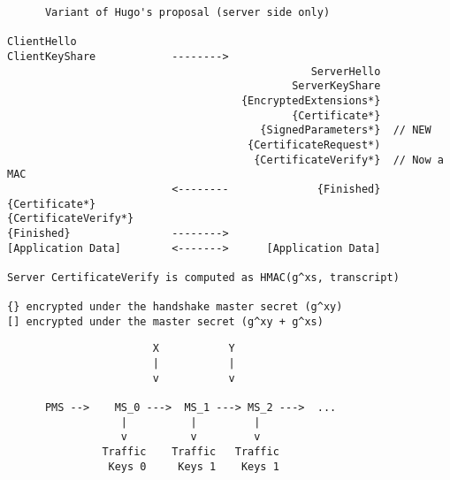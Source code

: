 \documentclass[helvetica]{seminar}
\begin{document}
\begin{slide}
\begin{footnotesize}
\begin{verbatim}
      Variant of Hugo's proposal (server side only)

ClientHello
ClientKeyShare            -------->
                                                ServerHello
                                             ServerKeyShare
                                     {EncryptedExtensions*}
                                             {Certificate*}
                                        {SignedParameters*}  // NEW
                                      {CertificateRequest*)
                                       {CertificateVerify*}  // Now a MAC                                                         
                          <--------              {Finished}
{Certificate*}
{CertificateVerify*}
{Finished}                -------->
[Application Data]        <------->      [Application Data]

Server CertificateVerify is computed as HMAC(g^xs, transcript)

{} encrypted under the handshake master secret (g^xy)
[] encrypted under the master secret (g^xy + g^xs)
\end{verbatim}
\end{footnotesize}
\end{slide}


\begin{slide}

\begin{footnotesize}
\begin{verbatim}
                       X           Y
                       |           |
                       v           v
                                 
      PMS -->    MS_0 --->  MS_1 ---> MS_2 --->  ...
                  |          |         |
                  v          v         v
               Traffic    Traffic   Traffic
                Keys 0     Keys 1    Keys 1
\end{verbatim}
\end{footnotesize}

\end{slide}
\end{document}
